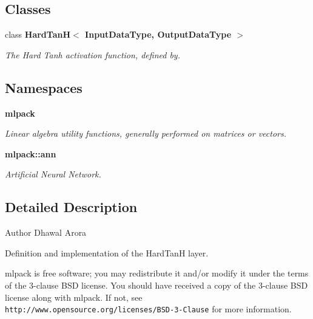 \subsection*{Classes}
\begin{DoxyCompactItemize}
\item 
class \textbf{ Hard\+Tan\+H$<$ Input\+Data\+Type, Output\+Data\+Type $>$}
\begin{DoxyCompactList}\small\item\em The Hard Tanh activation function, defined by. \end{DoxyCompactList}\end{DoxyCompactItemize}
\subsection*{Namespaces}
\begin{DoxyCompactItemize}
\item 
 \textbf{ mlpack}
\begin{DoxyCompactList}\small\item\em Linear algebra utility functions, generally performed on matrices or vectors. \end{DoxyCompactList}\item 
 \textbf{ mlpack\+::ann}
\begin{DoxyCompactList}\small\item\em Artificial Neural Network. \end{DoxyCompactList}\end{DoxyCompactItemize}


\subsection{Detailed Description}
\begin{DoxyAuthor}{Author}
Dhawal Arora
\end{DoxyAuthor}
Definition and implementation of the Hard\+TanH layer.

mlpack is free software; you may redistribute it and/or modify it under the terms of the 3-\/clause B\+SD license. You should have received a copy of the 3-\/clause B\+SD license along with mlpack. If not, see {\tt http\+://www.\+opensource.\+org/licenses/\+B\+S\+D-\/3-\/\+Clause} for more information. 